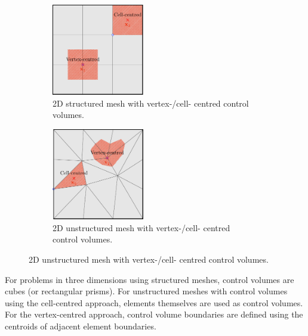 \documentclass{article}
\begin{document}
\begin{figure}[H]
    \centering
    \begin{subfigure}[t]{0.45\linewidth}
        \centering
        \includegraphics[height = 4cm]{figures/2d-structured-nodes.pdf}
        \caption{2D structured mesh with vertex-/cell- centred control volumes.} %
    \end{subfigure}
    \begin{subfigure}[t]{0.45\linewidth}
        \centering
        \includegraphics[height = 4cm]{figures/2d-unstructured-nodes.pdf}
        \caption{2D unstructured mesh with vertex-/cell- centred control volumes.} %
    \end{subfigure}
\end{figure}
For problems in three dimensions using structured meshes, control
volumes are cubes (or rectangular prisms). For unstructured meshes with
control volumes using the cell-centred approach, elements themselves are
used as control volumes. For the vertex-centred approach, control volume
boundaries are defined using the centroids of adjacent element boundaries.
\end{document}
